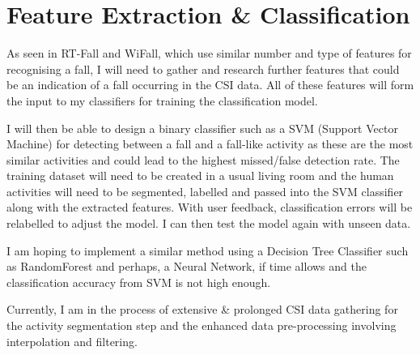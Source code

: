 \section{Feature Extraction \& Classification}
As seen in RT-Fall and WiFall, which use similar number and type of features for recognising a fall, I will need to gather and research further features that could be an indication of a fall occurring in the CSI data. All of these features will form the input to my classifiers for training the classification model. \par
I will then be able to design a binary classifier such as a SVM (Support Vector Machine) for detecting between a fall and a fall-like activity as these are the most similar activities and could lead to the highest missed/false detection rate. The training dataset will need to be created in a usual living room and the human activities will need to be segmented, labelled and passed into the SVM classifier along with the extracted features. With user feedback, classification errors will be relabelled to adjust the model. I can then test the model again with unseen data. \par 
I am hoping to implement a similar method using a Decision Tree Classifier such as RandomForest and perhaps, a Neural Network, if time allows and the classification accuracy from SVM is not high enough. 
\begin{comment}If I have enough time, I would like to investigate if the CSI.dat files are populated in real time and if there is a possibility of creating a Real Time system out of my work. \par \end{comment}
Currently, I am in the process of extensive \& prolonged CSI data gathering for the activity segmentation step and the enhanced data pre-processing involving interpolation and filtering. 